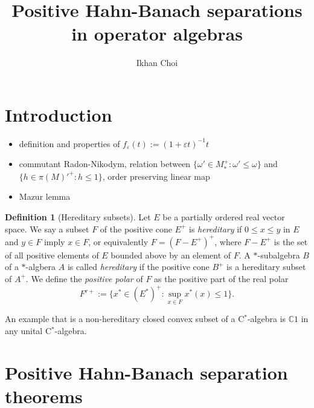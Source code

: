 \documentclass[a4paper]{amsart}
\title{Positive Hahn-Banach separations in operator algebras}
\author{Ikhan Choi}
\newcommand{\e}{\varepsilon}
\theoremstyle{plain}
\theoremstyle{definition}
\newtheorem{defn}[thm]{Definition}
\begin{document}
\begin{abstract}

\end{abstract}

\maketitle

\section{Introduction}






\begin{itemize}
\item definition and properties of $f_\e(t):=(1+\e t)^{-1}t$
\item commutant Radon-Nikodym, relation between $\{\omega'\in M_*^+:\omega'\le\omega\}$ and $\{h\in\pi(M)'^+:h\le1\}$, order preserving linear map
\item Mazur lemma
\end{itemize}


\begin{defn}[Hereditary subsets]
Let $E$ be a partially ordered real vector space.
We say a subset $F$ of the positive cone $E^+$ is \emph{hereditary} if $0\le x\le y$ in $E$ and $y\in F$ imply $x\in F$, or equivalently $F=(F-E^+)^+$, where $F-E^+$ is the set of all positive elements of $E$ bounded above by an element of $F$.
A $*$-subalgebra $B$ of a $*$-algbera $A$ is called \emph{hereditary} if the positive cone $B^+$ is a hereditary subset of $A^+$.
We define the \emph{positive polar} of $F$ as the positive part of the real polar
\[F^{r+}:=\{x^*\in(E^*)^+:\sup_{x\in F}x^*(x)\le1\}.\]
\end{defn}
An example that is a non-hereditary closed convex subset of a C$^*$-algebra is $\mathbb{C}1$ in any unital C$^*$-algebra.


\section{Positive Hahn-Banach separation theorems}
\end{document}
